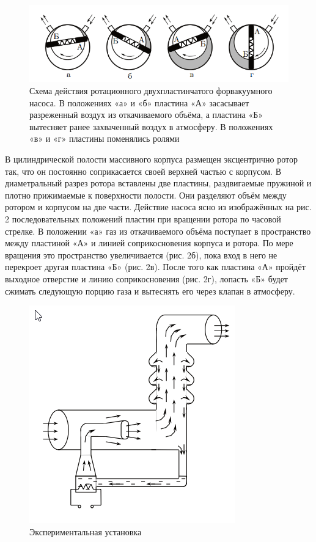 \documentclass[a4paper,12pt]{article}
\begin{document}
\newpage

\begin{figure}[h]
\centering
\includegraphics[width=0.8\linewidth]{2.png}
\caption{Схема действия ротационного двухпластинчатого форвакуумного насоса. В положениях «а» и «б» пластина «А» засасывает разреженный воздух
из откачиваемого объёма, а пластина «Б» вытесняет ранее захваченный воздух в атмосферу. В положениях «в» и «г» пластины поменялись ролями}
\label{fig:mpr}
\end{figure}

В цилиндрической полости массивного корпуса размещен эксцентрично ротор так, что он постоянно соприкасается своей верхней частью
с корпусом. В диаметральный разрез ротора вставлены две пластины,
раздвигаемые пружиной и плотно прижимаемые к поверхности полости.
Они разделяют объём между ротором и корпусом на две части.
Действие насоса ясно из изображённых на рис. 2 последовательных
положений пластин при вращении ротора по часовой стрелке. В положении «а» газ из откачиваемого объёма поступает в пространство между
пластиной «А» и линией соприкосновения корпуса и ротора. По мере
вращения это пространство увеличивается (рис. 2б), пока вход в него
не перекроет другая пластина «Б» (рис. 2в). После того как пластина
«А» пройдёт выходное отверстие и линию соприкосновения (рис. 2г),
лопасть «Б» будет сжимать следующую порцию газа и вытеснять его
через клапан в атмосферу.


\newpage


\begin{figure}[h]
\centering
\includegraphics[width=0.8\linewidth]{3.png}
\caption{Экспериментальная установка}
\label{fig:mpr}
\end{figure}
\end{document}
